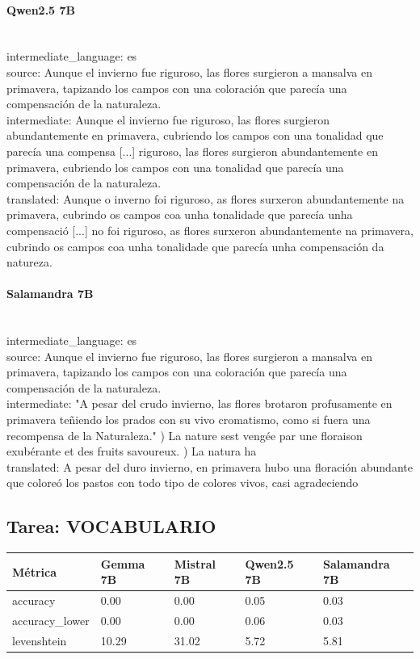 \paragraph{Qwen2.5 7B}~\\
{intermediate\_language:} es\\
{source:} Aunque el invierno fue riguroso, las flores surgieron a mansalva en primavera, tapizando los campos con una coloración que parecía una compensación de la naturaleza. \\
{intermediate:} Aunque el invierno fue riguroso, las flores surgieron abundantemente en primavera, cubriendo los campos con una tonalidad que parecía una compensa [...]  riguroso, las flores surgieron abundantemente en primavera, cubriendo los campos con una tonalidad que parecía una compensación de la naturaleza.\\
{translated:} Aunque o inverno foi riguroso, as flores surxeron abundantemente na primavera, cubrindo os campos coa unha tonalidade que parecía unha compensació [...] no foi riguroso, as flores surxeron abundantemente na primavera, cubrindo os campos coa unha tonalidade que parecía unha compensación da natureza.\\

\paragraph{Salamandra 7B}~\\
{intermediate\_language:} es\\
{source:} Aunque el invierno fue riguroso, las flores surgieron a mansalva en primavera, tapizando los campos con una coloración que parecía una compensación de la naturaleza. \\
{intermediate:} "A pesar del crudo invierno, las flores brotaron profusamente en primavera teñiendo los prados con su vivo cromatismo, como si fuera una recompensa de la Naturaleza."  ) 	  La nature s\textquotesingle{}est vengée par une floraison exubérante et des fruits savoureux. ) 	  La natura ha\\
{translated:} A pesar del duro invierno, en primavera hubo una floración abundante que coloreó los pastos con todo tipo de colores vivos, casi agradeciendo\\

\subsection{Tarea: VOCABULARIO}\label{tarea-vocabulario}
{\def\LTcaptype{none}
\begin{longtable}[]{@{}lllll@{}}
\toprule\noalign{}
Métrica & Gemma 7B & Mistral 7B & Qwen2.5 7B & Salamandra 7B \\
\midrule\noalign{}
\endhead
\bottomrule\noalign{}
\endlastfoot
accuracy & 0.00 & 0.00 & 0.05 & 0.03 \\
accuracy\_lower & 0.00 & 0.00 & 0.06 & 0.03 \\
levenshtein & 10.29 & 31.02 & 5.72 & 5.81 \\
\end{longtable}}

